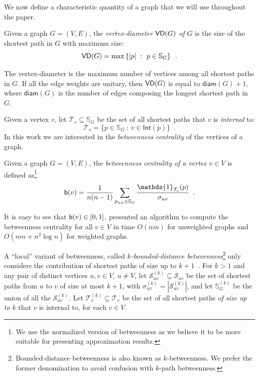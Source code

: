 We now define a characteristic quantity of a graph that we will use throughout
the paper.
\begin{definition}\label{def:vertexdiam}
  Given a graph $G=(V,E)$, the \emph{vertex-diameter $\mathsf{VD}(G)$ of $G$} is the
  size of the shortest path in $G$ with maximum size:
  \[
  \mathsf{VD}(G) = \max\left\{|p| ~:~ p\in \mathbb{S}_G\right\}\enspace.\]
\end{definition}
The vertex-diameter is the maximum number of vertices among all shortest paths
in $G$. If all the edge weights are unitary, then $\mathsf{VD}(G)$ is equal to
$\mathsf{diam}(G)+1$, where $\mathsf{diam}(G)$ is the number of edges composing
the longest shortest path in $G$. 

Given a vertex $v$, let $\mathcal{T}_v\subseteq\mathbb{S}_G$ be the set of all
shortest paths that $v$ is \emph{internal} to:
\[
\mathcal{T}_v=\{p\in\mathbb{S}_G ~:~ v\in\mathsf{Int}(p)\}\enspace.
\]
In this work we are interested in the \emph{betweenness centrality} of the
vertices of a graph.

\begin{definition}\label{def:betwenness}
  \citep{Anthonisse71,Freeman77} Given a graph $G=(V,E)$, the \emph{betweenness
  centrality of a vertex $v\in V$} is defined as\footnote{We use the normalized
  version of betweenness as we believe it to be more suitable for presenting
  approximation results.}
  \[
  \betw(v)=\frac{1}{n(n-1)}\sum_{p_{uw}\in\mathbb{S}_G}\frac{\mathds{1}_{\mathcal{T}_v}(p)}{\sigma_{uv}}%
  \enspace.
  \]
\end{definition} 

It is easy to see that $\mathsf{b}(v)\in[0,1]$. \citet{Brandes01} presented an
algorithm to compute the betweenness centrality for all $v\in V$ in time
$O(nm)$ for unweighted graphs and $O(nm + n^2 \log n)$ for weighted graphs. 

\ifproof
\else
A ``local'' variant of betweenness, called \emph{$k$-bounded-distance
betweenness}\footnote{Bounded-distance betweenness is also known as
$k$-betweenness. We prefer the former denomination to avoid confusion with
$k$-path betweenness.} only considers
the contribution of shortest paths of size up to $k+1$~\citep{BorgattiE06,Brandes08}.
For $k>1$ and any pair of distinct vertices $u,v\in V$, $u\neq V$, let
$\mathcal{S}^{(k)}_{uv}\subseteq\mathcal{S}_{uv}$ be the set of shortest paths
from $u$ to $v$ of size at most $k+1$, with
$\sigma^{(k)}_{uv}=|\mathcal{S}^{(k)}_{uv}|$, and let $\mathbb{S}^{(k)}_G$ be the
union of all the $\mathcal{S}^{(k)}_{uv}$. Let
$\mathcal{T}^{(k)}_v\subseteq\mathcal{T}_v$ be the set of all shortest paths
\emph{of size up to $k$} that $v$ is internal to, for each $v\in V$.

